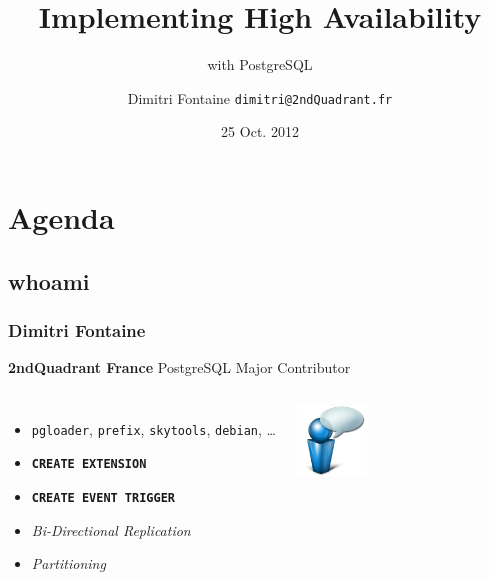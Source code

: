 \documentclass[english]{beamer}
\title{Implementing High Availability}
\subtitle{with PostgreSQL}
\author{Dimitri Fontaine \newline\tiny{\texttt{dimitri@2ndQuadrant.fr}}}
\date{25 Oct. 2012}
\begin{document}
\frame{\titlepage}

\section{Agenda}
\subsection{whoami}
\frame{\tableofcontents[currentsection]}

\begin{frame}[fragile]
  \frametitle{Dimitri Fontaine}

  \begin{center}
    \textbf{2ndQuadrant France}
    \linebreak
    PostgreSQL Major Contributor
  \end{center}
  \linebreak

\begin{columns}[c]

  \begin{itemize}
   \item<1-> \texttt{pgloader}, \texttt{prefix}, \texttt{skytools}, \texttt{debian}, …
   \item<1-> \texttt{\textbf{CREATE EXTENSION}}
   \item<2-> \texttt{\textbf{CREATE EVENT TRIGGER}}
   \item<2-> \textit{Bi-Directional Replication}
   \item<3-> \textit{Partitioning}
  \end{itemize}  

\begin{center}
  \includegraphics[height=5em]{bulle-blue-icon.png}
\end{center}
\end{columns}
\end{frame}
\end{document}
